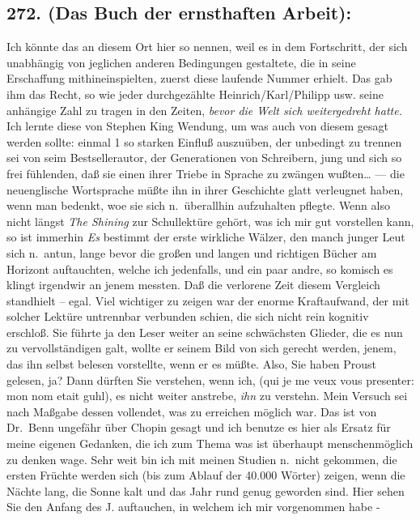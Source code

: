 \documentclass[
]{article}
\author{}
\date{\vspace{-2.5em}}
\begin{document}
\subsection{272. (Das Buch der ernsthaften
Arbeit):}\label{das-buch-der-ernsthaften-arbeit}

Ich könnte das an diesem Ort hier so nennen, weil es in dem Fortschritt,
der sich unabhängig von jeglichen anderen Bedingungen gestaltete, die in
seine Erschaffung mithineinspielten, zuerst diese laufende Nummer
erhielt. Das gab ihm das Recht, so wie jeder durchgezählte
Heinrich/Karl/Philipp usw. seine anhängige Zahl zu tragen in den Zeiten,
\emph{bevor die Welt sich weitergedreht hatte.} Ich lernte diese von
Stephen King Wendung, um was auch von diesem gesagt werden sollte:
einmal 1 so starken Einfluß auszuüben, der unbedingt zu trennen sei von
seim Bestsellerautor, der Generationen von Schreibern, jung und sich so
frei fühlenden, daß sie einen ihrer Triebe in Sprache zu zwängen
wußten\ldots{} --- die neuenglische Wortsprache müßte ihn in ihrer
Geschichte glatt verleugnet haben, wenn man bedenkt, woe sie sich
n.~überallhin aufzuhalten pflegte. Wenn also nicht längst \emph{The
Shining} zur Schullektüre gehört, was ich mir gut vorstellen kann, so
ist immerhin \emph{Es} bestimmt der erste wirkliche Wälzer, den manch
junger Leut sich n.~antun, lange bevor die großen und langen und
richtigen Bücher am Horizont auftauchten, welche ich jedenfalls, und ein
paar andre, so komisch es klingt irgendwir an jenem messten. Daß die
verlorene Zeit diesem Vergleich standhielt -- egal. Viel wichtiger zu
zeigen war der enorme Kraftaufwand, der mit solcher Lektüre untrennbar
verbunden schien, die sich nicht rein kognitiv erschloß. Sie führte ja
den Leser weiter an seine schwächsten Glieder, die es nun zu
vervollständigen galt, wollte er seinem Bild von sich gerecht werden,
jenem, das ihn selbst belesen vorstellte, wenn er es müßte. Also, Sie
haben Proust gelesen, ja? Dann dürften Sie verstehen, wenn ich, (qui je
me veux vous presenter: mon nom etait guhl), es nicht weiter anstrebe,
\emph{ihn} zu verstehn. Mein Versuch sei nach Maßgabe dessen vollendet,
was zu erreichen möglich war. Das ist von Dr.~Benn ungefähr über Chopin
gesagt und ich benutze es hier als Ersatz für meine eigenen Gedanken,
die ich zum Thema was ist überhaupt menschenmöglich zu denken wage. Sehr
weit bin ich mit meinen Studien n.~nicht gekommen, die ersten Früchte
werden sich (bis zum Ablauf der 40.000 Wörter) zeigen, wenn die Nächte
lang, die Sonne kalt und das Jahr rund genug geworden sind. Hier sehen
Sie den Anfang des J. auftauchen, in welchem ich mir vorgenommen habe -
\end{document}
